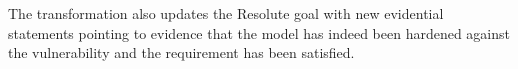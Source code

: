 The transformation also updates the Resolute goal with new evidential statements pointing to evidence that the model has indeed been hardened against the vulnerability and the requirement has been satisfied. 
%
%

%
